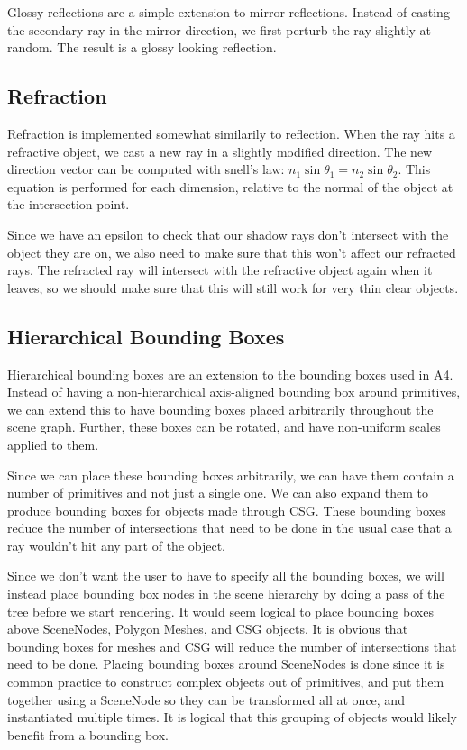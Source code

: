 \documentclass {article}
\begin{document}
Glossy reflections are a simple extension to mirror reflections.  Instead of
casting the secondary ray in the mirror direction, we first perturb the ray
slightly at random. The result is a glossy looking reflection.

\subsection{Refraction}
Refraction is implemented somewhat similarily to reflection.  When the ray hits
a refractive object, we cast a new ray in a slightly modified direction.  The
new direction vector can be computed with snell's law: $n_1\sin{\theta_1} =
n_2\sin{\theta_2}$.  This equation is performed for each dimension, relative to
the normal of the object at the intersection point.

Since we have an epsilon to check that our shadow rays don't intersect with the
object they are on, we also need to make sure that this won't affect our
refracted rays.  The refracted ray will intersect with the refractive object
again when it leaves, so we should make sure that this will still work for very
thin clear objects.

\subsection{Hierarchical Bounding Boxes}
Hierarchical bounding boxes are an extension to the bounding boxes used in A4.
Instead of having a non-hierarchical axis-aligned bounding box around
primitives, we can extend this to have bounding boxes placed arbitrarily
throughout the scene graph.  Further, these boxes can be rotated, and have
non-uniform scales applied to them.

Since we can place these bounding boxes arbitrarily, we can have them contain a
number of primitives and not just a single one.  We can also expand them to
produce bounding boxes for objects made through CSG.  These bounding boxes
reduce the number of intersections that need to be done in the usual case that a
ray wouldn't hit any part of the object.

Since we don't want the user to have to specify all the bounding boxes, we will
instead place bounding box nodes in the scene hierarchy by doing a pass of the
tree before we start rendering.  It would seem logical to place bounding boxes
above SceneNodes, Polygon Meshes, and CSG objects.  It is obvious that bounding
boxes for meshes and CSG will reduce the number of intersections that need to be
done.  Placing bounding boxes around SceneNodes is done since it is common
practice to construct complex objects out of primitives, and put them together
using a SceneNode so they can be transformed all at once, and instantiated
multiple times.  It is logical that this grouping of objects would likely
benefit from a bounding box.
\end{document}
